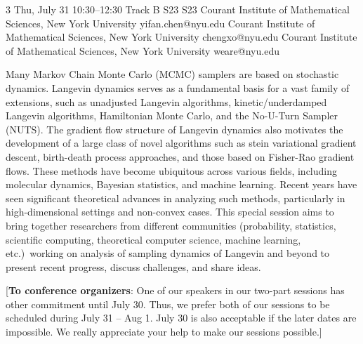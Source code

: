 \begin{talk}
  {3}%
  {}%
  {}%
  {}%
  {}%
  {}%
  {Thu, July 31 10:30–12:30 Track B}%
  {S23}%
  {S23}%
  {%
    {Courant Institute of Mathematical Sciences, New York University}%
    {yifan.chen@nyu.edu}}%
  {%
	{Courant Institute of Mathematical Sciences, New York University}%
	{chengxo@nyu.edu}}%
    {
    {Courant Institute of Mathematical Sciences, New York University}
    {weare@nyu.edu}}
 



Many Markov Chain Monte Carlo (MCMC) samplers are based on stochastic dynamics. Langevin dynamics serves as a fundamental basis for a vast family of extensions, such as unadjusted Langevin algorithms, kinetic/underdamped Langevin algorithms, Hamiltonian Monte Carlo, and the No-U-Turn Sampler (NUTS). The gradient flow structure of Langevin dynamics also motivates the development of a large class of novel algorithms such as stein variational gradient descent, birth-death process approaches, and those based on Fisher-Rao gradient flows. These methods have become ubiquitous across various fields, including molecular dynamics, Bayesian statistics, and machine learning. Recent years have seen significant theoretical advances in analyzing such methods, particularly in high-dimensional settings and non-convex cases. This special session aims to bring together researchers from different communities (probability, statistics, scientific computing, theoretical computer science, machine learning, etc.)\ working on analysis of sampling dynamics of Langevin and beyond to present recent progress, discuss challenges, and share ideas. 

[\textbf{To conference organizers}: One of our speakers in our two-part sessions has other commitment until July 30. Thus, we prefer both of our sessions to be scheduled during July 31 -- Aug 1. July 30 is also acceptable if the later dates are impossible. We really appreciate your help to make our sessions possible.]



\end{talk}
